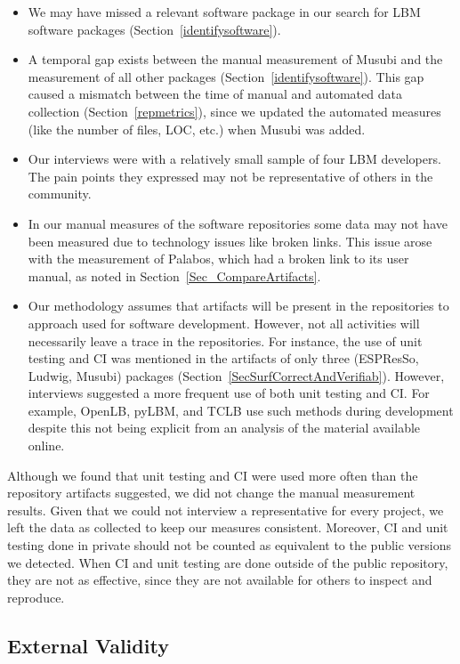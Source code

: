 \documentclass[final, 3p, times, authoryear]{elsarticle}
\begin{document}
\begin{itemize}
\item We may have missed a relevant software package in our search for LBM
software packages (Section~\ref{identifysoftware}).
\item A temporal gap exists between the manual measurement of Musubi and the
measurement of all other packages (Section~\ref{identifysoftware}). This gap
caused a mismatch between the time of manual and automated data collection
(Section~\ref{repmetrics}), since we updated the automated measures (like the
number of files, LOC, etc.) when Musubi was added.
\item Our interviews were with a relatively small sample of four LBM developers.
The pain points they expressed may not be representative of others in the
community.
\item In our manual measures of the software repositories some data may not have
been measured due to technology issues like broken links. This issue arose with
the measurement of Palabos, which had a broken link to its user manual, as noted
in Section~\ref{Sec_CompareArtifacts}. 
\item Our methodology assumes that artifacts will be present in the repositories
to approach used for software development.  However, not all activities will
necessarily leave a trace in the repositories. For instance, the use of unit
testing and CI was mentioned in the artifacts of only three (ESPResSo, Ludwig,
Musubi) packages (Section~\ref{SecSurfCorrectAndVerifiab}). However, interviews
suggested a more frequent use of both unit testing and CI. For example, OpenLB,
pyLBM, and TCLB use such methods during development despite this not being
explicit from an analysis of the material available online.
\end{itemize}

Although we found that unit testing and CI were used more often than the
repository artifacts suggested, we did not change the manual measurement
results.  Given that we could not interview a representative for every project,
we left the data as collected to keep our measures consistent.  Moreover, CI and
unit testing done in private should not be counted as equivalent to the public
versions we detected.  When CI and unit testing are done outside of the public
repository, they are not as effective, since they are not available for others
to inspect and reproduce.

\subsection{External Validity}
\end{document}
